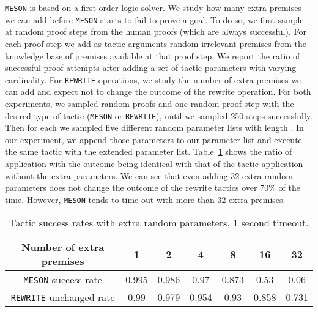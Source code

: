 \documentclass{article}
\begin{document}
{\tt MESON} is based on a first-order logic solver. We study how many extra premises we can add before {\tt MESON} starts to fail to prove a goal.
To do so, we first sample at random proof steps from the human proofs (which are always successful).
For each proof step we add as tactic arguments random irrelevant premises from the
knowledge base of
premises available at that proof step.
We report the ratio of successful proof attempts after adding a set of tactic parameters with varying cardinality.
For {\tt REWRITE} operations, we study the number of extra premises we can add and expect not to change the outcome of the rewrite operation. 
For both experiments, we sampled random proofs and one random
proof step with the desired type of tactic ({\tt MESON} or {\tt REWRITE}), until we sampled 250
steps successfully. Then for each  we sampled five different random parameter lists with length . In our experiment, we append those parameters to our parameter list and execute the same tactic with the extended parameter list. Table~\ref{table:tacticstats} shows the ratio of application with the outcome being identical with that of the tactic application without the extra parameters. We can see that even adding 32 extra random parameters does not change the outcome of the rewrite tactics over 70\% of the time.
However, {\tt MESON} tends to time out with more than 32 extra premises.
\begin{table}
\begin{minipage}{\linewidth} \centering
\caption{Tactic success rates with extra random parameters, 1 second timeout.}
\label{table:tacticstats}
\begin{tabular}{|c|c|c|c|c|c|c|}
\hline
Number of extra premises & 1 & 2 & 4 & 8 & 16 & 32 \\
\hline
{\tt MESON} success rate  & 0.995 & 0.986 & 0.97 & 0.873 & 0.53 & 0.06 \\
\hline
{\tt REWRITE} unchanged rate & 
0.99 & 0.979 & 0.954 & 0.93 & 0.858 & 0.731 \\
\hline
\end{tabular}
\end{minipage}
\end{table}
\end{document}

